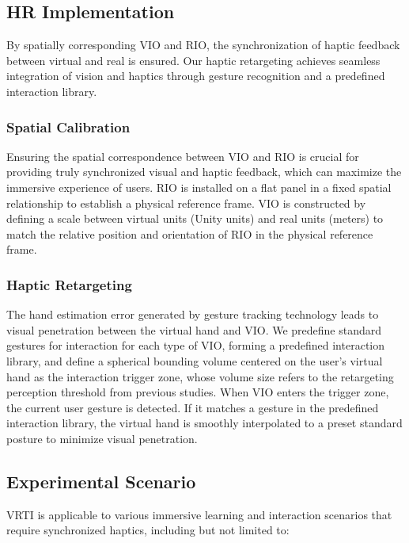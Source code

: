 \documentclass[runningheads]{llncs}
\begin{document}
\subsection{HR Implementation}
By spatially corresponding VIO and RIO, the synchronization of haptic feedback between virtual and real is ensured. Our haptic retargeting achieves seamless integration of vision and haptics through gesture recognition and a predefined interaction library.

\subsubsection{Spatial Calibration}
Ensuring the spatial correspondence between VIO and RIO is crucial for providing truly synchronized visual and haptic feedback, which can maximize the immersive experience of users. RIO is installed on a flat panel in a fixed spatial relationship to establish a physical reference frame. VIO is constructed by defining a scale between virtual units (Unity units) and real units (meters) to match the relative position and orientation of RIO in the physical reference frame.

\subsubsection{Haptic Retargeting}
The hand estimation error generated by gesture tracking technology leads to visual penetration between the virtual hand and VIO. We predefine standard gestures for interaction for each type of VIO, forming a predefined interaction library, and define a spherical bounding volume centered on the user's virtual hand as the interaction trigger zone, whose volume size refers to the retargeting perception threshold from previous studies. When VIO enters the trigger zone, the current user gesture is detected. If it matches a gesture in the predefined interaction library, the virtual hand is smoothly interpolated to a preset standard posture to minimize visual penetration.

\subsection{Experimental Scenario}
VRTI is applicable to various immersive learning and interaction scenarios that require synchronized haptics, including but not limited to:
\end{document}
